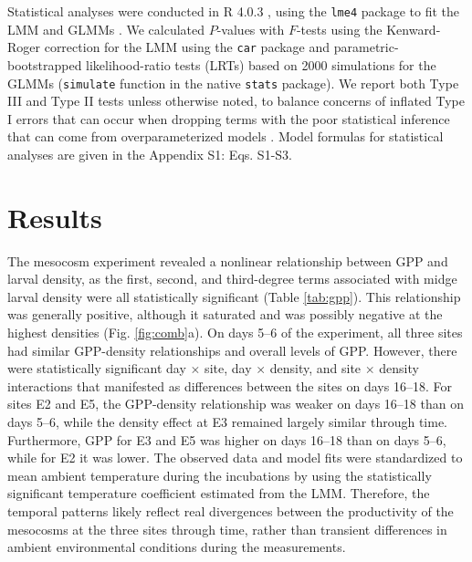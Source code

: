 \documentclass[12pt]{article}
\begin{document}
Statistical analyses were conducted in R 4.0.3 \citep{r2020},
using the \texttt{lme4} package to fit the LMM and GLMMs \citep{lme4}.
We calculated $\textit{P}$-values with $\textit{F}$-tests using
the Kenward-Roger correction for the LMM \citep{halekoh2014kenward} 
using the \texttt{car} package \citep {fox2019}
and parametric-bootstrapped likelihood-ratio tests (LRTs) based on 2000 simulations
for the GLMMs (\texttt{simulate} function in the native \texttt{stats} package).
We report both Type III and Type II tests unless otherwise noted,
to balance concerns of inflated Type I errors that can occur when dropping 
terms with the poor statistical inference that can come from overparameterized models
\citep{zuur2009}.
Model formulas for statistical analyses are given in the Appendix S1: Eqs. S1-S3.






\section*{Results}

The mesocosm experiment revealed a nonlinear relationship between GPP and larval density,
as the first, second, and third-degree terms associated with midge larval density 
were all statistically significant (Table \ref{tab:gpp}). 
This relationship was generally positive, 
although it saturated 
and was possibly negative at the highest densities (Fig. \ref{fig:comb}a).
On days 5--6 of the experiment, 
all three sites had similar GPP-density relationships and overall levels of GPP.
However, there were statistically significant day $\times$ site, day $\times$ density,
and site $\times$ density interactions that manifested as differences
between the sites on days 16--18.
For sites E2 and E5, the GPP-density relationship was weaker 
on days 16--18 than on days 5--6, 
while the density effect at E3 remained largely similar through time.
Furthermore, GPP for E3 and E5 was higher on days 16--18 than on days 5--6, 
while for E2 it was lower.
The observed data and model fits were standardized to mean ambient temperature 
during the incubations by using the statistically significant temperature coefficient 
estimated from the LMM. 
Therefore, the temporal patterns likely reflect real divergences 
between the productivity of the mesocosms at the three sites through time, 
rather than transient differences in ambient environmental conditions 
during the measurements.
\end{document}
